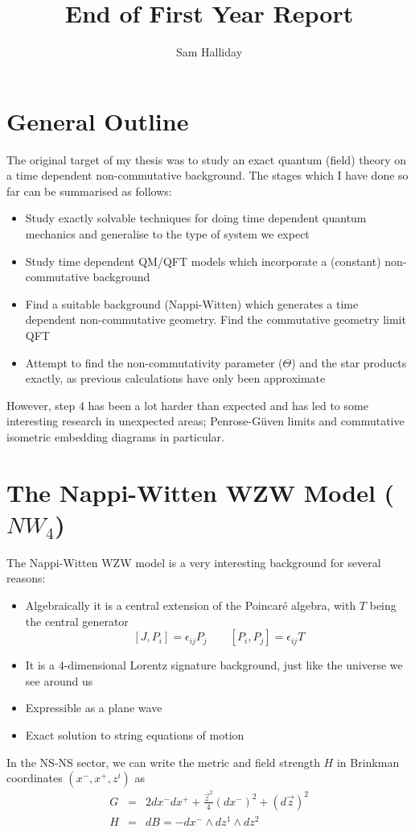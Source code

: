 \documentclass[11pt, a4paper, titlepage]{article}
\begin{document}
\title{End of First Year Report}
\author{Sam Halliday}
\maketitle
\section{General Outline}
The original target of my thesis was to study an exact quantum (field) theory on
a time dependent non-commutative background. The stages which I have done so far
can be summarised as follows:
\begin{itemize}
\item Study exactly solvable techniques for doing time dependent quantum
  mechanics and generalise to the type of system we expect
\item Study time dependent QM/QFT models which incorporate a (constant)
  non-commutative background
\item Find a suitable background (Nappi-Witten) which generates a time dependent
  non-commutative geometry. Find the commutative geometry limit QFT
\item Attempt to find the non-commutativity parameter ($\Theta$) and the star
  products exactly, as previous calculations have only been approximate
\end{itemize}
However, step 4 has been a lot harder than expected and has led to some
interesting research in unexpected areas; Penrose-G\"{u}ven limits and
commutative isometric embedding diagrams in particular.

\section{The Nappi-Witten WZW Model ($NW_4$)}
The Nappi-Witten WZW model \cite{nw} is a very interesting background for
several reasons:
\begin{itemize}
\item Algebraically it is a central extension of the Poincar\'{e} algebra, with
  $T$ being the central generator
  \begin{equation}
    \label{eq:nw:poincare}
    \left[J,P_i\right]=\epsilon_{ij}P_j \qquad
    \left[P_i,P_j\right]=\epsilon_{ij}T
  \end{equation}
\item It is a 4-dimensional Lorentz signature background, just like the
  universe we see around us
\item Expressible as a plane wave
\item Exact solution to string equations of motion
\end{itemize}
In the NS-NS sector, we can write the metric and field strength $H$ in Brinkman
coordinates $(x^-,x^+,z^i)$ as
\begin{eqnarray}
  \label{eq:nw:G}
  G&=&2dx^-dx^+ +\frac{\vec{z}^2}{4}\left(d
    x^-\right)^2 + \left(d\vec{z}\right)^2 \\
  \label{eq:nw:H}
  H&=&dB=-dx^-\wedge dz^1\wedge dz^2
\end{eqnarray}
\end{document}
